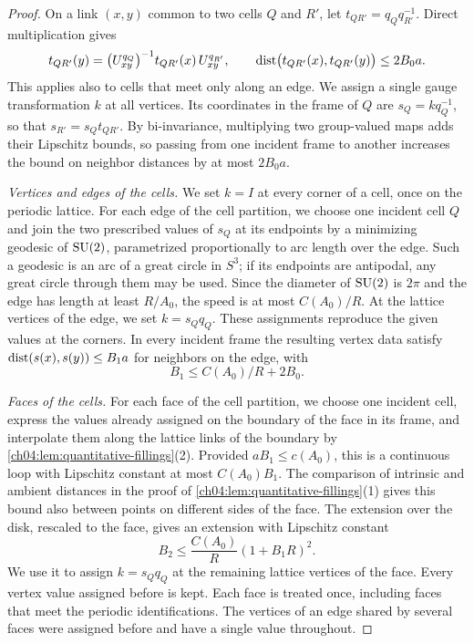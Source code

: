 \begin{proof}
On a link $(x,y)$ common to two cells $Q$ and $R'$, let $t_{QR'}=q_Qq_{R'}^{-1}$. Direct multiplication gives
\begin{equation}\label{ch04:eq:transition}
 t_{QR'}(y)=\bigl(U^{q_Q}_{xy}\bigr)^{-1}t_{QR'}(x)\,U^{q_{R'}}_{xy},\qquad\operatorname{dist}\bigl(t_{QR'}(x),t_{QR'}(y)\bigr)\le2B_0a.
\end{equation}
This applies also to cells that meet only along an edge. We assign a single gauge transformation $k$ at all vertices. Its coordinates in the frame of $Q$ are $s_Q=kq_Q^{-1}$, so that $s_{R'}=s_Qt_{QR'}$. By bi-invariance, multiplying two group-valued maps adds their Lipschitz bounds, so passing from one incident frame to another increases the bound on neighbor distances by at most $2B_0a$.

\emph{Vertices and edges of the cells.} We set $k=I$ at every corner of a cell, once on the periodic lattice. For each edge of the cell partition, we choose one incident cell $Q$ and join the two prescribed values of $s_Q$ at its endpoints by a minimizing geodesic of $\mathrm{SU}(2)$, parametrized proportionally to arc length over the edge. Such a geodesic is an arc of a great circle in $S^3$; if its endpoints are antipodal, any great circle through them may be used. Since the diameter of $\mathrm{SU}(2)$ is $2\pi$ and the edge has length at least $R/A_0$, the speed is at most $C(A_0)/R$. At the lattice vertices of the edge, we set $k=s_Qq_Q$. These assignments reproduce the given values at the corners. In every incident frame the resulting vertex data satisfy $\operatorname{dist}(s(x),s(y))\le B_1a$ for neighbors on the edge, with
\[
 B_1\le C(A_0)/R+2B_0.
\]

\emph{Faces of the cells.} For each face of the cell partition, we choose one incident cell, express the values already assigned on the boundary of the face in its frame, and interpolate them along the lattice links of the boundary by \cref{ch04:lem:quantitative-fillings}(2). Provided $aB_1\le c(A_0)$, this is a continuous loop with Lipschitz constant at most $C(A_0)B_1$. The comparison of intrinsic and ambient distances in the proof of \cref{ch04:lem:quantitative-fillings}(1) gives this bound also between points on different sides of the face. The extension over the disk, rescaled to the face, gives an extension with Lipschitz constant
\[
 B_2\le\frac{C(A_0)}R(1+B_1R)^2.
\]
We use it to assign $k=s_Qq_Q$ at the remaining lattice vertices of the face. Every vertex value assigned before is kept. Each face is treated once, including faces that meet the periodic identifications. The vertices of an edge shared by several faces were assigned before and have a single value throughout.


\end{proof}
